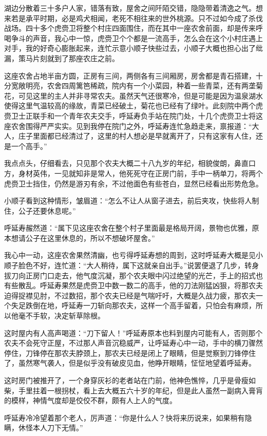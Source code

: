 湖边分散着三十多户人家，错落有致，屋舍之间阡陌交错，隐隐带着清逸之气。想来若是承平时期，必是鸡犬相闻，老死不相往来的世外桃源。只不过如今成了杀伐战场。四十多个虎赍卫将整个村庄四面围住，而在其中一座农舍前面，却是传来呼喝争斗的声音，我心中一惊，虎赍卫个个都是一流高手，怎么会在这个小村庄遇上对手，我的好奇心膨胀起来，连忙示意小顺子快些过去，小顺子大概也担心出了纰漏，策马片刻就到了那座农庄之前。

这座农舍占地半亩方圆，正房有三间，两侧各有三间厢房，房舍都是青石搭建，十分宽敞明亮，农舍四周篱笆稀疏，院内有一个小菜园，种着一些青菜，还有两垄菊花，可见这里的主人并非寻常农夫。虽然天气还很寒冷，但是可能是因为温泉湖水使得这里气温较高的缘故，青菜已经破土，菊花也已经有了绿叶。此刻院中两个虎赍卫士正联手和一个青年农夫交手，呼延寿负手站在院门处，十几个虎赍卫士将这座农舍围得严严实实。见到我停在院门之外，呼延寿连忙急趋走来，禀报道：“大人，庄子里面都已经清过了，这里的村人想必是早就离开了，只有这家有人住，还是一个高手。”

我点点头，仔细看去，只见那个农夫大概二十八九岁的年纪，相貌俊朗，鼻直口方，身材英伟，一见就知非是常人，他死死守在正房门前，手中一柄单刀，将两个虎赍卫士挡住，仍然是游刃有余，不过他面色有些苍白，显然已经看出形势危急。

小顺子看到这种情形，皱眉道：“怎么不让人从窗子进去，前后夹攻，快些将人制住，公子还要休息呢。”

呼延寿赧然道：“属下见这座农舍在整个村子里面最是格局开阔，景物也优雅，原本想请公子在这里休息的，所以不想破坏屋舍。”

我心中一动，这座农舍果然清幽，也亏得呼延寿想的周到，这时呼延寿大概是见小顺子脸色不好，连忙道：“大人稍待，属下这就亲自出手。”说罢便退了几步，转身拔刀向正房门口走去，他气度沉凝，那个农夫眼中闪过绝望的光芒，手上的招式也有些散乱。呼延寿果然是虎赍卫中数一数二的高手，他的刀法刚猛凶狠，将那农夫迫得捉襟见肘，不过数招，那个农夫已经是气喘吁吁，大概是久战力疲，那农夫一个失足跌倒在地，呼延寿一刀斩向那农夫，这样一个高手留着，只怕会有麻烦，所以他毫不手软，决定斩草除根。

这时屋内有人高声喝道：“刀下留人！”呼延寿原本也料到屋内可能有人，否则那个农夫不会死守正屋，不过那人声音沉稳威严，让呼延寿心中一动，手中的横刀骤然停住，刀锋停在那农夫脖颈上，那农夫已经是闭上了眼睛，但是觉察到刀锋停住了，虽然寒气袭人，但是似乎没有破皮见血，他睁开眼睛，怔怔地望着呼延寿。

这时房门被推开了，一个身穿灰衫的老者站在门前，他神色憔悴，几乎是骨瘦如柴，手里拄着一根拐杖，看上去大概五六十岁的年纪，但是此人虽然一副病入膏肓的模样，神情气度却是佼佼不群，颇有人上人的气度。

呼延寿冷冷望着那个老人，厉声道：“你是什么人？快将来历说来，如果稍有隐瞒，休怪本人刀下无情。”

